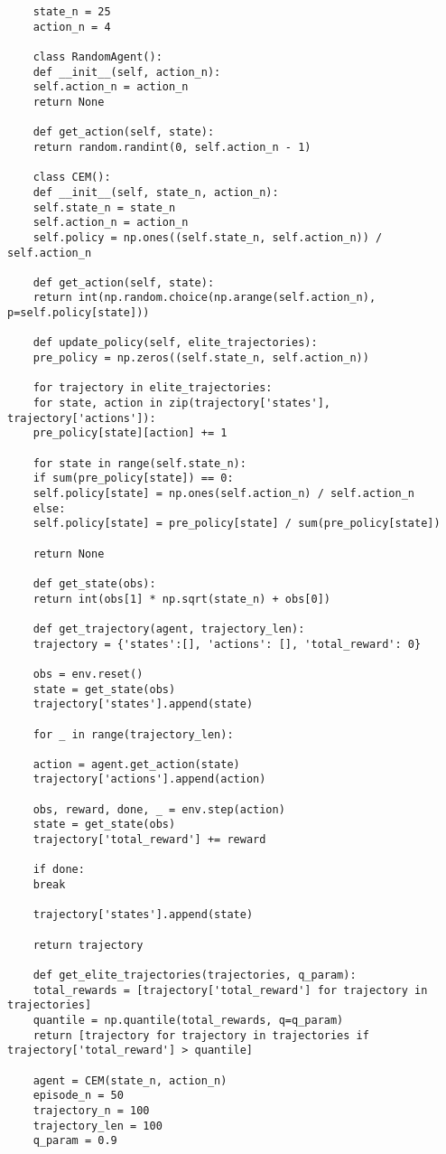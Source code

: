 \begin{lstlisting}
	state_n = 25
	action_n = 4
	
	class RandomAgent():
	def __init__(self, action_n):
	self.action_n = action_n
	return None
	
	def get_action(self, state):
	return random.randint(0, self.action_n - 1)
	
	class CEM():
	def __init__(self, state_n, action_n):
	self.state_n = state_n
	self.action_n = action_n
	self.policy = np.ones((self.state_n, self.action_n)) / self.action_n
	
	def get_action(self, state):
	return int(np.random.choice(np.arange(self.action_n), p=self.policy[state]))
	
	def update_policy(self, elite_trajectories):
	pre_policy = np.zeros((self.state_n, self.action_n))
	
	for trajectory in elite_trajectories:
	for state, action in zip(trajectory['states'], trajectory['actions']):
	pre_policy[state][action] += 1
	
	for state in range(self.state_n):
	if sum(pre_policy[state]) == 0:
	self.policy[state] = np.ones(self.action_n) / self.action_n
	else:
	self.policy[state] = pre_policy[state] / sum(pre_policy[state])
	
	return None
	
	def get_state(obs):
	return int(obs[1] * np.sqrt(state_n) + obs[0])
	
	def get_trajectory(agent, trajectory_len):
	trajectory = {'states':[], 'actions': [], 'total_reward': 0}
	
	obs = env.reset()
	state = get_state(obs)
	trajectory['states'].append(state)
	
	for _ in range(trajectory_len):
	
	action = agent.get_action(state)
	trajectory['actions'].append(action)
	
	obs, reward, done, _ = env.step(action)
	state = get_state(obs)
	trajectory['total_reward'] += reward
	
	if done:
	break
	
	trajectory['states'].append(state)
	
	return trajectory
	
	def get_elite_trajectories(trajectories, q_param):
	total_rewards = [trajectory['total_reward'] for trajectory in trajectories]
	quantile = np.quantile(total_rewards, q=q_param) 
	return [trajectory for trajectory in trajectories if trajectory['total_reward'] > quantile]
	
	agent = CEM(state_n, action_n)
	episode_n = 50
	trajectory_n = 100
	trajectory_len = 100
	q_param = 0.9
	

\end{lstlisting}
